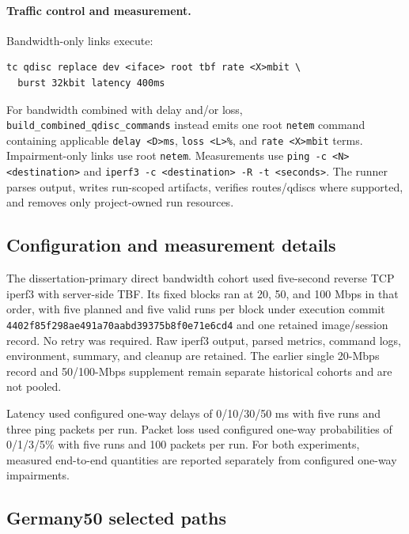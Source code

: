 \paragraph{Traffic control and measurement.} Bandwidth-only links execute:
\begin{verbatim}
tc qdisc replace dev <iface> root tbf rate <X>mbit \
  burst 32kbit latency 400ms
\end{verbatim}
For bandwidth combined with delay and/or loss, \texttt{build\_combined\_qdisc\_commands} instead emits one root \texttt{netem} command containing applicable \texttt{delay <D>ms}, \texttt{loss <L>\%}, and \texttt{rate <X>mbit} terms. Impairment-only links use root \texttt{netem}. Measurements use \texttt{ping -c <N> <destination>} and \texttt{iperf3 -c <destination> -R -t <seconds>}. The runner parses output, writes run-scoped artifacts, verifies routes/qdiscs where supported, and removes only project-owned run resources.

\subsection{Configuration and measurement details}

The dissertation-primary direct bandwidth cohort used five-second reverse TCP iperf3 with server-side TBF. Its fixed blocks ran at 20, 50, and 100 Mbps in that order, with five planned and five valid runs per block under execution commit \texttt{4402f85f298ae491a70aabd39375b8f0e71e6cd4} and one retained image/session record. No retry was required. Raw iperf3 output, parsed metrics, command logs, environment, summary, and cleanup are retained. The earlier single 20-Mbps record and 50/100-Mbps supplement remain separate historical cohorts and are not pooled.

Latency used configured one-way delays of 0/10/30/50 ms with five runs and three ping packets per run. Packet loss used configured one-way probabilities of 0/1/3/5\% with five runs and 100 packets per run. For both experiments, measured end-to-end quantities are reported separately from configured one-way impairments.

\subsection{Germany50 selected paths}


